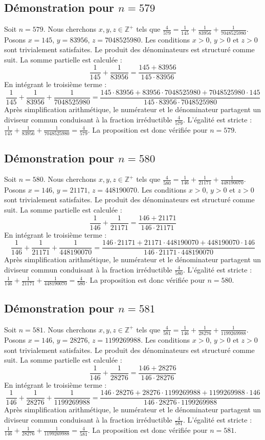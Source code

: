\documentclass[11pt,a4paper]{article}
\begin{document}
\subsection{Démonstration pour $n = 579$}
Soit $n = 579$. Nous cherchons $x, y, z \in \mathbb{Z}^{+}$ tels que $\frac{4}{579} = \frac{1}{145} + \frac{1}{83956} + \frac{1}{7048525980}$.
Posons $x = 145$, $y = 83956$, $z = 7048525980$.
Les conditions $x > 0$, $y > 0$ et $z > 0$ sont trivialement satisfaites.
Le produit des dénominateurs est structuré comme suit. La somme partielle est calculée :
$$ \frac{1}{145} + \frac{1}{83956} = \frac{145+83956}{145 \cdot 83956} $$
En intégrant le troisième terme :
$$ \frac{1}{145} + \frac{1}{83956} + \frac{1}{7048525980} = \frac{145 \cdot 83956 + 83956 \cdot 7048525980 + 7048525980 \cdot 145}{145 \cdot 83956 \cdot 7048525980} $$
Après simplification arithmétique, le numérateur et le dénominateur partagent un diviseur commun conduisant à la fraction irréductible $\frac{4}{579}$.
L'égalité est stricte : $\frac{1}{145} + \frac{1}{83956} + \frac{1}{7048525980} = \frac{4}{579}$.
La proposition est donc vérifiée pour $n = 579$.
\subsection{Démonstration pour $n = 580$}
Soit $n = 580$. Nous cherchons $x, y, z \in \mathbb{Z}^{+}$ tels que $\frac{4}{580} = \frac{1}{146} + \frac{1}{21171} + \frac{1}{448190070}$.
Posons $x = 146$, $y = 21171$, $z = 448190070$.
Les conditions $x > 0$, $y > 0$ et $z > 0$ sont trivialement satisfaites.
Le produit des dénominateurs est structuré comme suit. La somme partielle est calculée :
$$ \frac{1}{146} + \frac{1}{21171} = \frac{146+21171}{146 \cdot 21171} $$
En intégrant le troisième terme :
$$ \frac{1}{146} + \frac{1}{21171} + \frac{1}{448190070} = \frac{146 \cdot 21171 + 21171 \cdot 448190070 + 448190070 \cdot 146}{146 \cdot 21171 \cdot 448190070} $$
Après simplification arithmétique, le numérateur et le dénominateur partagent un diviseur commun conduisant à la fraction irréductible $\frac{4}{580}$.
L'égalité est stricte : $\frac{1}{146} + \frac{1}{21171} + \frac{1}{448190070} = \frac{4}{580}$.
La proposition est donc vérifiée pour $n = 580$.
\subsection{Démonstration pour $n = 581$}
Soit $n = 581$. Nous cherchons $x, y, z \in \mathbb{Z}^{+}$ tels que $\frac{4}{581} = \frac{1}{146} + \frac{1}{28276} + \frac{1}{1199269988}$.
Posons $x = 146$, $y = 28276$, $z = 1199269988$.
Les conditions $x > 0$, $y > 0$ et $z > 0$ sont trivialement satisfaites.
Le produit des dénominateurs est structuré comme suit. La somme partielle est calculée :
$$ \frac{1}{146} + \frac{1}{28276} = \frac{146+28276}{146 \cdot 28276} $$
En intégrant le troisième terme :
$$ \frac{1}{146} + \frac{1}{28276} + \frac{1}{1199269988} = \frac{146 \cdot 28276 + 28276 \cdot 1199269988 + 1199269988 \cdot 146}{146 \cdot 28276 \cdot 1199269988} $$
Après simplification arithmétique, le numérateur et le dénominateur partagent un diviseur commun conduisant à la fraction irréductible $\frac{4}{581}$.
L'égalité est stricte : $\frac{1}{146} + \frac{1}{28276} + \frac{1}{1199269988} = \frac{4}{581}$.
La proposition est donc vérifiée pour $n = 581$.
\end{document}
